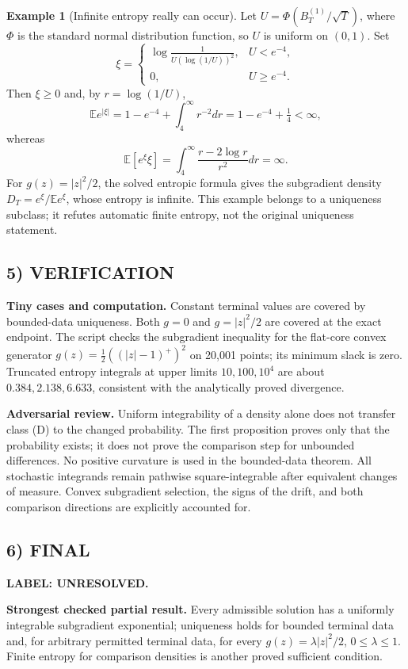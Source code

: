 \documentclass[11pt,a4paper]{article}
\newcommand{\E}{\mathbb E}
\theoremstyle{definition}
\newtheorem{example}[theorem]{Example}
\newcommand{\unresolved}{\textbf{LABEL: UNRESOLVED.}}
\begin{document}
\begin{example}[Infinite entropy really can occur]
Let $U=\Phi(B_T^{(1)}/\sqrt T)$, where $\Phi$ is the standard normal distribution function, so $U$ is uniform on $(0,1)$. Set
\[
 \xi=\begin{cases}
 \displaystyle\log\frac{1}{U(\log(1/U))^2},&U<e^{-4},\\
 0,&U\ge e^{-4}.
 \end{cases}
\]
Then $\xi\ge0$ and, by $r=\log(1/U)$,
\[
 \E e^{|\xi|}=1-e^{-4}+\int_4^\infty r^{-2}dr
 =1-e^{-4}+\tfrac14<\infty,
\]
whereas
\[
 \E[e^\xi\xi]=\int_4^\infty\frac{r-2\log r}{r^2}dr=\infty.
\]
For $g(z)=|z|^2/2$, the solved entropic formula gives the subgradient density
$D_T=e^\xi/\E e^\xi$, whose entropy is infinite. This example belongs to a uniqueness subclass; it refutes automatic finite entropy, not the original uniqueness statement.
\end{example}

\subsection*{5) VERIFICATION}
\textbf{Tiny cases and computation.} Constant terminal values are covered by bounded-data uniqueness. Both $g=0$ and $g=|z|^2/2$ are covered at the exact endpoint. The script checks the subgradient inequality for the flat-core convex generator
$g(z)=\frac12((|z|-1)^+)^2$ on 20,001 points; its minimum slack is zero. Truncated entropy integrals at upper limits $10,100,10^4$ are about $0.384,2.138,6.633$, consistent with the analytically proved divergence.

\textbf{Adversarial review.} Uniform integrability of a density alone does not transfer class (D) to the changed probability. The first proposition proves only that the probability exists; it does not prove the comparison step for unbounded differences. No positive curvature is used in the bounded-data theorem. All stochastic integrands remain pathwise square-integrable after equivalent changes of measure. Convex subgradient selection, the signs of the drift, and both comparison directions are explicitly accounted for.

\subsection*{6) FINAL}
\unresolved

\textbf{Strongest checked partial result.} Every admissible solution has a uniformly integrable subgradient exponential; uniqueness holds for bounded terminal data and, for arbitrary permitted terminal data, for every $g(z)=\lambda|z|^2/2$, $0\le\lambda\le1$. Finite entropy for comparison densities is another proved sufficient condition.
\end{document}
